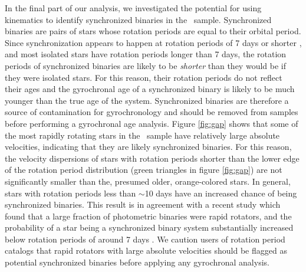 In the final part of our analysis, we investigated the potential for using
kinematics to identify synchronized binaries in the \mct\ sample.
Synchronized binaries are pairs of stars whose rotation periods are equal to
their orbital period.
Since synchronization appears to happen at rotation periods of 7 days or
shorter \citep{simonian2019}, and most isolated stars have rotation periods
longer than 7 days, the rotation periods of synchronized binaries are likely
to be {\it shorter} than they would be if they were isolated stars.
For this reason, their rotation periods do not reflect their ages and the
gyrochronal age of a synchronized binary is likely to be much younger than the
true age of the system.
Synchronized binaries are therefore a source of contamination for
gyrochronology and should be removed from samples before performing a
gyrochronal age analysis.
Figure \ref{fig:gap} shows that some of the most rapidly rotating stars in the
\mct\ sample have relatively large absolute velocities, indicating that they
are likely synchronized binaries.
For this reason, the velocity dispersions of stars with rotation periods
shorter than the lower edge of the rotation period distribution (green
triangles in figure \ref{fig:gap}) are not significantly smaller than the,
presumed older, orange-colored stars.
In general, stars with rotation periods less than $\sim$10 days have an
increased chance of being synchronized binaries.
This result is in agreement with a recent study which found that a large
fraction of photometric binaries were rapid rotators, and the probability of a
star being a synchronized binary system substantially increased below rotation
periods of around 7 days \citep{simonian2019}.
We caution users of rotation period catalogs that rapid rotators with large
absolute velocities should be flagged as potential synchronized binaries
before applying any gyrochronal analysis.
